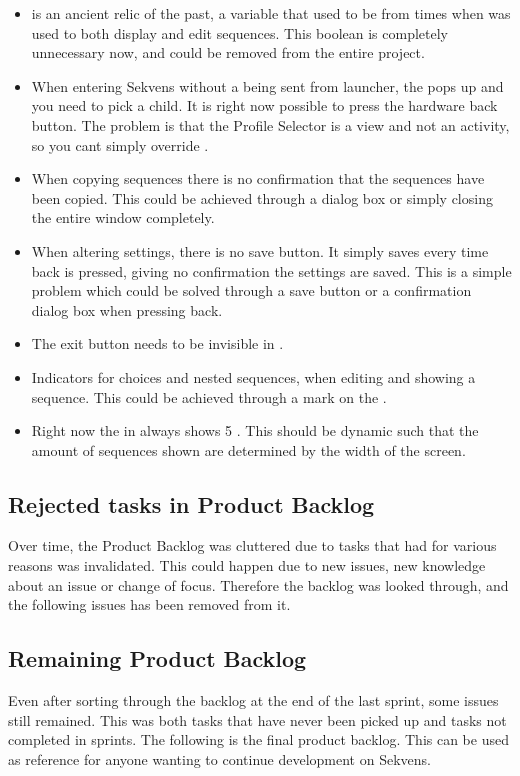 \begin{itemize}
\item {} is an ancient relic of the past, a variable that used to be from times when  was used to both display and edit sequences. This boolean is completely unnecessary now, and could be removed from the entire project.
\item When entering Sekvens without a  being sent from launcher, the  pops up and you need to pick a child. It is right now possible to press the hardware back button. The problem is that the Profile Selector is a view and not an activity, so you cant simply override .
\item When copying sequences there is no confirmation that the sequences have been copied. This could be achieved through a dialog box or simply closing the entire window completely.
\item When altering settings, there is no save button. It simply saves every time back is pressed, giving no confirmation the settings are saved. This is a simple problem which could be solved through a save button or a confirmation dialog box when pressing back.
\item The exit button needs to be invisible in . 
\item Indicators for choices and nested sequences, when editing and showing a sequence. This could be achieved through a mark on the .
\item Right now the  in  always shows 5 . This should be dynamic such that the amount of sequences shown are determined by the width of the screen.
\end{itemize}

\subsection{Rejected tasks in Product Backlog}
Over time, the Product Backlog was cluttered due to tasks that had for various reasons was invalidated. This could happen due to new issues, new knowledge about an issue or change of focus. Therefore the backlog was looked through, and the following issues has been removed from it.

\subsection{Remaining Product Backlog}
Even after sorting through the backlog at the end of the last sprint, some issues still remained. This was both tasks that have never been picked up and tasks not completed in sprints. The following is the final product backlog. This can be used as reference for anyone wanting to continue development on Sekvens.
